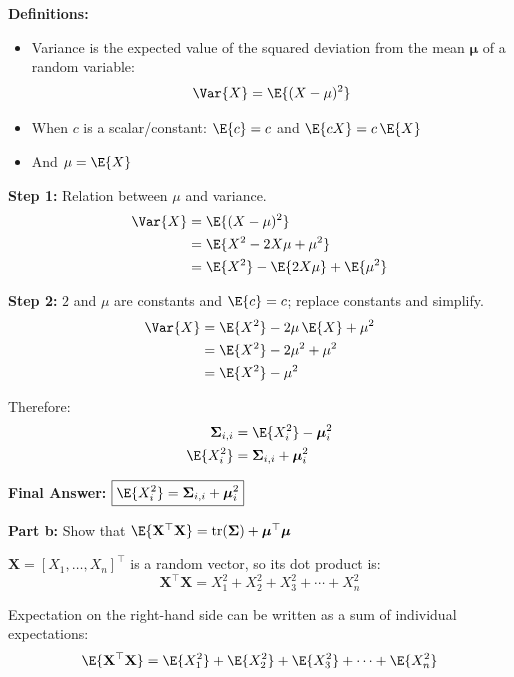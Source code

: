 \documentclass{article}
\begin{document}
\begin{aprob}
    \medskip
    \textbf{Definitions:}
    \begin{itemize}
        \item Variance is the expected value of the squared deviation from the mean $\boldsymbol\mu$ of a random variable:
        \[
            \Var{X} = \E{(X - \mu)^2}
        \]
        \item When $c$ is a scalar/constant: $\E{c} = c$ and $\E{cX} = c\,\E{X}$
        \item And $\mu = \E{X}$
    \end{itemize}

    \medskip
    \textbf{Step 1:} Relation between $\mu$ and variance.
    \begin{align*}
        \Var{X} &= \E{(X - \mu)^2} \\
                &= \E{X^2 - 2X\mu + \mu^2} \\
                &= \E{X^2} - \E{2X\mu} + \E{\mu^2}
    \end{align*}

    \textbf{Step 2:} $2$ and $\mu$ are constants and $\E{c} = c$; replace constants and simplify.
    \begin{align*}
        \Var{X} &= \E{X^2} - 2\mu\,\E{X} + \mu^2 \\
                &= \E{X^2} - 2\mu^2 + \mu^2 \\
                &= \E{X^2} - \mu^2
    \end{align*}

    Therefore:
    \begin{align*}
        \boldsymbol\Sigma_{i,i} &= \E{X_i^2} - \boldsymbol\mu_i^2 \\
        \E{X_i^2} &= \boldsymbol\Sigma_{i,i} + \boldsymbol\mu_i^2
    \end{align*}

    \medskip
    \textbf{Final Answer:} $\boxed{\E{X_i^2} = \boldsymbol\Sigma_{i,i} + \boldsymbol\mu_i^2}$

    \bigskip
    \begin{mdframed}
    \textbf{\large Part b:} Show that $\E{\mathbf{X}^\top \mathbf{X}} = \mathrm{tr}(\boldsymbol\Sigma) + \boldsymbol\mu^\top\boldsymbol\mu$
    \end{mdframed}

    $\mathbf{X} = [X_1, \ldots, X_n]^\top$ is a random vector, so its dot product is:
    \[
        \mathbf{X}^\top \mathbf{X} = X_1^2 + X_2^2 + X_3^2 + \cdots + X_n^2
    \]

    Expectation on the right-hand side can be written as a sum of individual expectations:
    \[
        \E{\mathbf{X}^\top \mathbf{X}} = \E{X_1^2} + \E{X_2^2} + \E{X_3^2} + \cdots + \E{X_n^2}
    \]


\end{aprob}
\end{document}
